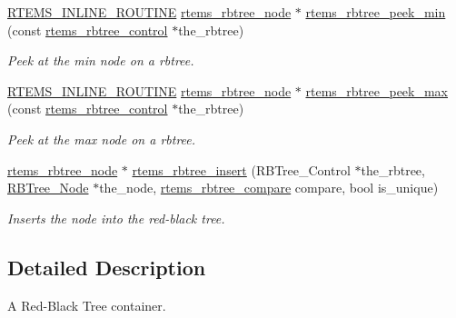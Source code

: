 \begin{DoxyCompactItemize}
\mbox{\hyperlink{group__RTEMSScoreBaseDefs_gac216239df231d5dbd15e3520b0b9313f}{R\+T\+E\+M\+S\+\_\+\+I\+N\+L\+I\+N\+E\+\_\+\+R\+O\+U\+T\+I\+NE}} \mbox{\hyperlink{group__ClassicRBTrees_gaef47fc7fc61856c9afbf7f18a26ff80d}{rtems\+\_\+rbtree\+\_\+node}} $\ast$ \mbox{\hyperlink{group__ClassicRBTrees_gaf8534bd70e35281fe993c5b6fd1a20b8}{rtems\+\_\+rbtree\+\_\+peek\+\_\+min}} (const \mbox{\hyperlink{group__ClassicRBTrees_ga21fe446d0b3cb8b25c814e93357753ef}{rtems\+\_\+rbtree\+\_\+control}} $\ast$the\+\_\+rbtree)
\begin{DoxyCompactList}\small\item\em Peek at the min node on a rbtree. \end{DoxyCompactList}\item 
\mbox{\hyperlink{group__RTEMSScoreBaseDefs_gac216239df231d5dbd15e3520b0b9313f}{R\+T\+E\+M\+S\+\_\+\+I\+N\+L\+I\+N\+E\+\_\+\+R\+O\+U\+T\+I\+NE}} \mbox{\hyperlink{group__ClassicRBTrees_gaef47fc7fc61856c9afbf7f18a26ff80d}{rtems\+\_\+rbtree\+\_\+node}} $\ast$ \mbox{\hyperlink{group__ClassicRBTrees_gad222071d34caea276c4b61b05941735f}{rtems\+\_\+rbtree\+\_\+peek\+\_\+max}} (const \mbox{\hyperlink{group__ClassicRBTrees_ga21fe446d0b3cb8b25c814e93357753ef}{rtems\+\_\+rbtree\+\_\+control}} $\ast$the\+\_\+rbtree)
\begin{DoxyCompactList}\small\item\em Peek at the max node on a rbtree. \end{DoxyCompactList}\item 
\mbox{\hyperlink{group__ClassicRBTrees_gaef47fc7fc61856c9afbf7f18a26ff80d}{rtems\+\_\+rbtree\+\_\+node}} $\ast$ \mbox{\hyperlink{group__ClassicRBTrees_gafcc464323a9d653a77e75e79bb6c274c}{rtems\+\_\+rbtree\+\_\+insert}} (R\+B\+Tree\+\_\+\+Control $\ast$the\+\_\+rbtree, \mbox{\hyperlink{structRBTree__Node}{R\+B\+Tree\+\_\+\+Node}} $\ast$the\+\_\+node, \mbox{\hyperlink{group__ClassicRBTrees_gae5f1cdaef7551cbee5a877e65f442b93}{rtems\+\_\+rbtree\+\_\+compare}} compare, bool is\+\_\+unique)
\begin{DoxyCompactList}\small\item\em Inserts the node into the red-\/black tree. \end{DoxyCompactList}\end{DoxyCompactItemize}


\subsection{Detailed Description}
A Red-\/\+Black Tree container. 

